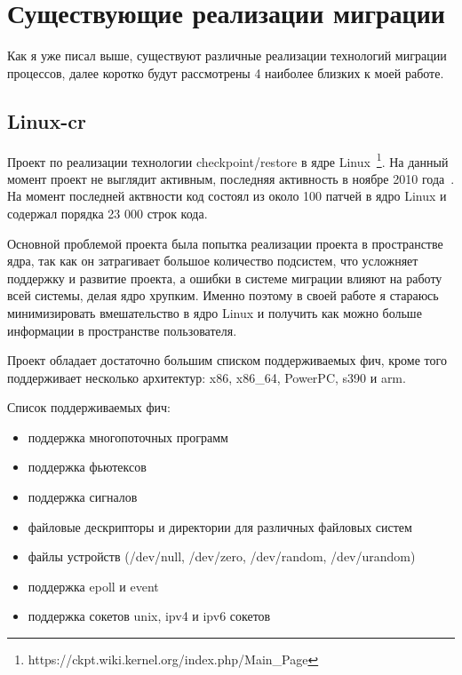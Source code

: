 \section{Существующие реализации миграции}

Как я уже писал выше, существуют различные реализации технологий миграции процессов, далее коротко будут рассмотрены 4 наиболее близких к моей работе.

\subsection{Linux-cr}
\label{linux_cr}

Проект по реализации технологии checkpoint/restore в ядре Linux~\footnote{https://ckpt.wiki.kernel.org/index.php/Main\_Page}. На данный момент проект не выглядит активным, последняя активность в ноябре 2010 года~\cite{linux_cr_lwn_report}. На момент последней актвности код состоял из около 100 патчей в ядро Linux и содержал порядка 23 000 строк кода.

Основной проблемой проекта была попытка реализации проекта в пространстве ядра, так как он затрагивает большое количество подсистем, что усложняет поддержку и развитие проекта, а ошибки в системе миграции влияют на работу всей системы, делая ядро хрупким. Именно поэтому в своей работе я стараюсь минимизировать вмешательство в ядро Linux и получить как можно больше информации в пространстве пользователя.

Проект обладает достаточно большим списком поддерживаемых фич, кроме того поддерживает несколько архитектур: x86, x86\_64, PowerPC, s390 и arm.

Список поддерживаемых фич:

\begin{itemize}

    \item поддержка многопоточных программ
    \item поддержка фьютексов
    \item поддержка сигналов
    \item файловые дескрипторы и директории для различных файловых систем
    \item файлы устройств (/dev/null, /dev/zero, /dev/random, /dev/urandom)
    \item поддержка epoll и event
    \item поддержка сокетов unix, ipv4 и ipv6 сокетов

\end{itemize}

